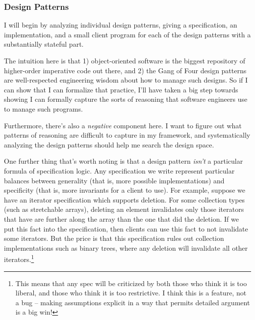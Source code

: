 \subsubsection{Design Patterns}

I will begin by analyzing individual design patterns, giving a
specification, an implementation, and a small client program for each
of the design patterns with a substantially stateful part.

The intuition here is that 1) object-oriented software is the biggest
repository of higher-order imperative code out there, and 2) the Gang
of Four design patterns are well-respected engineering wisdom about
how to manage such designs. So if I can show that I can formalize that
practice, I'll have taken a big step towards showing I can formally
capture the sorts of reasoning that software engineers use to manage
such programs.

Furthermore, there's also a \emph{negative} component here. I want to
figure out what patterns of reasoning are difficult to capture in my
framework, and systematically analyzing the design patterns should
help me search the design space.

One further thing that's worth noting is that a design pattern
\emph{isn't} a particular formula of specification logic. Any
specification we write represent particular balances between
generality (that is, more possible implementations) and specificity
(that is, more invariants for a client to use). For example, suppose
we have an iterator specification which supports deletion. For some
collection types (such as stretchable arrays), deleting an element
invalidates only those iterators that have are further along the array
than the one that did the deletion. If we put this fact into the
specification, then clients can use this fact to not invalidate some
iterators. But the price is that this specification rules out
collection implementations such as binary trees, where any deletion
will invalidate all other iterators.\footnote{This means that any spec
will be criticized by both those who think it is too liberal, and
those who think it is too restrictive. I think this is a feature,
not a bug -- making assumptions explicit in a way that permits
detailed argument is a big win!}


